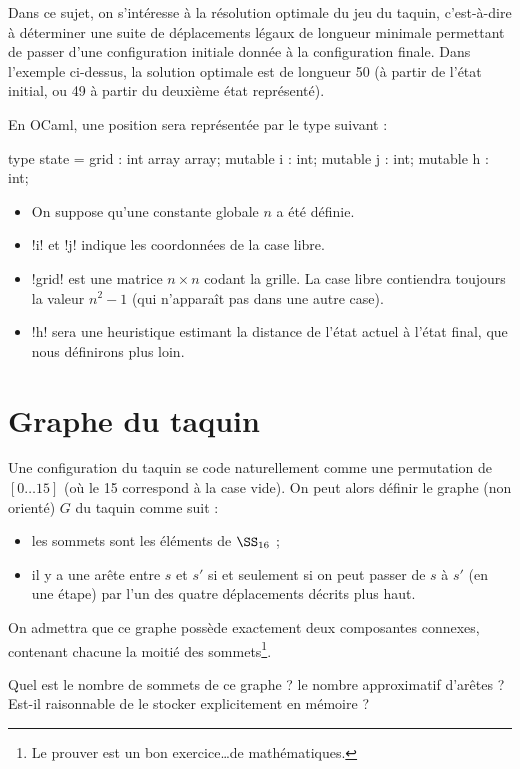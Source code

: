 Dans ce sujet, on s'intéresse à la résolution optimale du jeu du taquin,
c'est-à-dire à déterminer une suite de déplacements légaux de longueur
minimale permettant de passer d'une configuration initiale donnée à
la configuration finale.
Dans l'exemple ci-dessus, la solution optimale est de longueur 50
(à partir de l'état initial, ou 49 à partir du deuxième état
représenté).

En OCaml, une position sera représentée par le type suivant :
\begin{ocaml}
type state = {
  grid : int array array;
  mutable i : int;
  mutable j : int;
  mutable h : int;
}
\end{ocaml}

\begin{itemize}
  \item On suppose qu'une constante globale $n$ a été définie.
  \item \ml!i! et \ml!j! indique les coordonnées de la case libre.
  \item \ml!grid! est une matrice $n \times n$ codant la grille.
        La case libre contiendra toujours la valeur $n^{2} - 1$
        (qui n'apparaît pas dans une autre case).
  \item \ml!h! sera une heuristique estimant la distance de l'état
        actuel à l'état final, que nous définirons plus loin.
\end{itemize}


\section{Graphe du taquin}


Une configuration du taquin se code naturellement comme une
permutation de $[0\dots 15]$ (où le 15 correspond à la case vide).
On peut alors définir le graphe (non orienté) $G$ du taquin comme suit :
\begin{itemize}
  \item les sommets sont les éléments de $\SS_{16}$ ;
  \item il y a une arête entre $s$ et $s'$ si et seulement si
        on peut passer de $s$ à $s'$ (en une étape)
        par l'un des quatre déplacements décrits plus haut.
\end{itemize}

On admettra que ce graphe possède exactement deux composantes connexes,
contenant chacune la moitié des sommets\footnote{Le prouver est un bon
exercice\dots de mathématiques.}.

\begin{ques}
  Quel est le nombre de sommets de ce graphe ? le nombre approximatif
  d'arêtes ? Est-il raisonnable de le stocker explicitement en mémoire ?
\end{ques}\medskip

